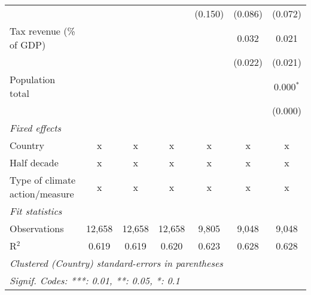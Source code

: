 \begin{tabular}{lcccccc}
                                                        &             &               &                & (0.150)        & (0.086)        & (0.072)\\   
   Tax revenue (\% of GDP)                              &             &               &                &                & 0.032          & 0.021\\   
                                                        &             &               &                &                & (0.022)        & (0.021)\\   
   Population total                                     &             &               &                &                &                & 0.000$^{*}$\\   
                                                        &             &               &                &                &                & (0.000)\\   
   \emph{Fixed effects}\\
   Country                                              & x           & x             & x              & x              & x              & x\\  
   Half decade                                          & x           & x             & x              & x              & x              & x\\  
   Type of climate action/measure                       & x           & x             & x              & x              & x              & x\\  
   \midrule \emph{Fit statistics}\\
   Observations                                         & 12,658      & 12,658        & 12,658         & 9,805          & 9,048          & 9,048\\  
   R$^2$                                                & 0.619       & 0.619         & 0.620          & 0.623          & 0.628          & 0.628\\  
   \midrule
   \multicolumn{7}{l}{\emph{Clustered (Country) standard-errors in parentheses}}\\
   \multicolumn{7}{l}{\emph{Signif. Codes: ***: 0.01, **: 0.05, *: 0.1}}\\
\end{tabular}
\par\endgroup


